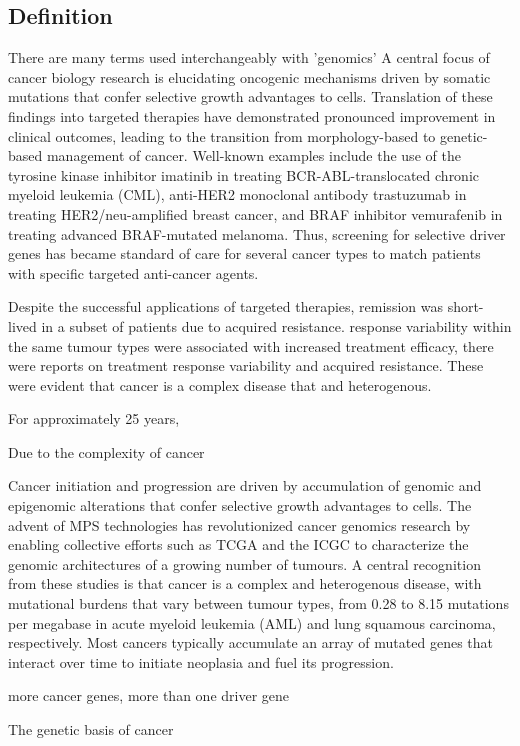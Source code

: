 \subsection{Definition}
There are many terms used interchangeably with 'genomics'
A central focus of cancer biology research is elucidating oncogenic mechanisms driven by somatic mutations that confer selective growth advantages to cells. Translation of these findings into targeted therapies have demonstrated pronounced improvement in clinical outcomes, leading to the transition from morphology-based to genetic-based management of cancer. Well-known examples include the use of the tyrosine kinase inhibitor imatinib in treating BCR-ABL-translocated chronic myeloid leukemia (CML), anti-HER2 monoclonal antibody trastuzumab in treating HER2/neu-amplified breast cancer, and BRAF inhibitor vemurafenib in treating advanced BRAF-mutated melanoma. Thus, screening for selective driver genes has became standard of care for several cancer types to match patients with specific targeted anti-cancer agents.

Despite the successful applications of targeted therapies, remission was short-lived in a subset of patients due to acquired resistance. response variability within the same tumour types were associated with increased treatment efficacy, there were reports on treatment response variability and acquired resistance. These were evident that cancer is a complex disease that and heterogenous.

For approximately 25 years,

Due to the complexity of cancer

Cancer initiation and progression are driven by accumulation of genomic and epigenomic alterations that confer selective growth advantages to cells. The advent of MPS technologies has revolutionized cancer genomics research by enabling collective efforts such as TCGA and the ICGC to characterize the genomic architectures of a growing number of tumours. A central recognition from these studies is that cancer is a complex and heterogenous disease, with mutational burdens that vary between tumour types, from 0.28 to 8.15 mutations per megabase in acute myeloid leukemia (AML) and lung squamous carcinoma, respectively. Most cancers typically accumulate an array of mutated genes that interact over time to initiate neoplasia and fuel its progression.

more cancer genes, more than one driver gene

The genetic basis of cancer

